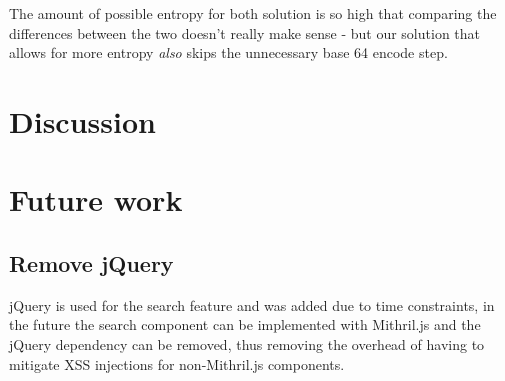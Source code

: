 \documentclass[12pt,a4paper]{report}
\begin{document}
The amount of possible entropy for both solution is so high that comparing the differences
between the two doesn't really make sense - but our solution that allows for more entropy
\textit{also} skips the unnecessary base 64 encode step.

\chapter{Discussion}
\chapter{Future work}
\label{sec:future-work}

\section{Remove jQuery}
\label{subsec:remove-jquery}
jQuery is used for the search feature and was added due to time constraints, in the future the search component can be implemented with Mithril.js and the jQuery dependency can be removed, thus removing the overhead of having to mitigate XSS injections for non-Mithril.js components.
 
\end{document}
